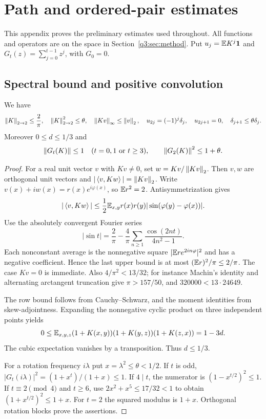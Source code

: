 \section{Path and ordered-pair estimates}\label{q3:app:foundations}
This appendix proves the preliminary estimates used throughout. All functions and operators are on the space in Section~\ref{q3:sec:method}. Put $u_j=\mathbb E K^j\mathbf1$ and $G_t(z)=\sum_{j=0}^{t-1}z^j$, with $G_0=0$.

\subsection{Spectral bound and positive convolution}
\begin{lemma}\label{q3:lem:spectral}
We have
\[
 \left\lVert K\right\rVert_{2\to2}\le\frac2\pi,\quad \left\lVert K\right\rVert_{2\to2}^2\le\theta,\quad
 \left\lVert Kv\right\rVert_\infty\le\left\lVert v\right\rVert_2,\quad
 u_{2j}=(-1)^j\delta_{j},\quad u_{2j+1}=0,\quad \delta_{j+1}\le\theta \delta_{j}.
\]
Moreover $0\le d\le1/3$ and
\[
 \left\lVert G_t(K)\right\rVert\le1\quad(t=0,1\text{ or }t\ge3),\qquad
 \left\lVert G_2(K)\right\rVert^2\le1+\theta.
\]
\end{lemma}
\begin{proof}
For a real unit vector $v$ with $Kv\ne0$, set $w=Kv/\left\lVert Kv\right\rVert_2$. Then $v,w$ are orthogonal unit vectors and $|\left\langle v,Kw\right\rangle|=\left\lVert Kv\right\rVert_2$. Write $v(x)+iw(x)=r(x)e^{i\varphi(x)}$, so $\mathbb E r^2=2$. Antisymmetrization gives
\[
 |\left\langle v,Kw\right\rangle|\le\frac12\mathbb E_{x,y}r(x)r(y)|\sin(\varphi(y)-\varphi(x))|.
\]
Use the absolutely convergent Fourier series
\[
 |\sin t|=\frac2\pi-\frac4\pi\sum_{n\ge1}\frac{\cos(2nt)}{4n^2-1}.
\]
Each nonconstant average is the nonnegative square $|\mathbb E r e^{2in\varphi}|^2$ and has a negative coefficient. Hence the last upper bound is at most $(\mathbb E r)^2/\pi\le2/\pi$. The case $Kv=0$ is immediate. Also $4/\pi^2<13/32$; for instance Machin's identity and alternating arctangent truncation give $\pi>157/50$, and $320000<13\cdot24649$.

The row bound follows from Cauchy--Schwarz, and the moment identities from skew-adjointness. Expanding the nonnegative cyclic product on three independent points yields
\[
 0\le\mathbb E_{x,y,z}(1+K(x,y))(1+K(y,z))(1+K(z,x))=1-3d.
\]
The cubic expectation vanishes by a transposition. Thus $d\le1/3$.

For a rotation frequency $i\lambda$ put $x=\lambda^2\le\theta<1/2$. If $t$ is odd, $|G_t(i\lambda)|^2=(1+x^t)/(1+x)\le1$. If $4\mid t$, the numerator is $(1-x^{t/2})^2\le1$. If $t\equiv2\pmod4$ and $t\ge6$, use $2x^2+x^5\le17/32<1$ to obtain $(1+x^{t/2})^2\le1+x$. For $t=2$ the squared modulus is $1+x$. Orthogonal rotation blocks prove the assertions.
\end{proof}

